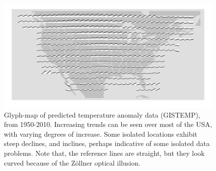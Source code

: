 \documentclass[oneside]{article}
\begin{document}
\begin{figure}[htbp]
  \centering
  \includegraphics[width=1\linewidth]{gistemp-pred}%

  \caption{Glyph-map of predicted temperature anomaly data (GISTEMP),
    from 1950-2010. Increasing trends can be seen over most of the
    USA, with varying degrees of increase. Some isolated locations
    exhibit steep declines, and inclines, perhaps indicative of some
    isolated data problems. Note that, the reference lines are
    straight, but they look curved because of the Z\"ollner optical
    illusion.}
  \label{fig:gistemp-pred}
\end{figure}

\end{document}
